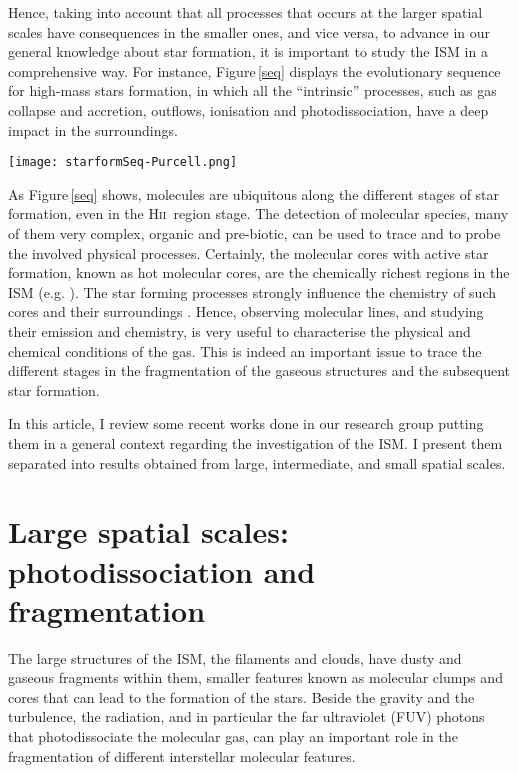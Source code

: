 \documentclass[baaa]{baaa}
\newcommand{\hii}{H\textsc{ii}}
\begin{document}
Hence, taking into account that all processes that occurs at the larger spatial scales have consequences in the smaller ones, and vice versa, to advance in our general knowledge about star formation, it is important to study the ISM in a comprehensive way.
For instance, Figure\,\ref{seq} displays the evolutionary sequence for high-mass stars formation, in which all the ``intrinsic'' processes, such as gas collapse and accretion, outflows, ionisation and photodissociation, have a deep impact in the surroundings. 

\begin{figure*}[h]
\centering
\texttt{[image: starformSeq-Purcell.png]}
\caption{Sketch showing the evolutionary sequence for high-mass stars formation.
Credits: Cormac Purcell.}
\label{seq}
\end{figure*}

As Figure\,\ref{seq} shows, molecules are ubiquitous along the different stages of star formation, even in the \hii~region stage. The detection of molecular species, many of them very complex, organic and pre-biotic, can be used to trace and to probe the involved physical processes. Certainly, the molecular cores with active star formation, known as hot molecular cores, are the chemically richest regions in the ISM (e.g. \citealt{herbst09,bonfand19}). The star forming processes strongly influence the chemistry of such cores and their surroundings \citep{jorgen20}. Hence, observing molecular lines, and studying their emission and chemistry, is very useful to characterise the physical and chemical conditions of the gas. This is indeed an important issue to trace the different stages in the fragmentation of the gaseous structures and the subsequent star formation. 

In this article, I review some recent works done in our research group putting them in a general context regarding the investigation of the ISM. I present them separated into results obtained from large, intermediate, and small spatial scales.


\section{Large spatial scales: photodissociation and fragmentation} 

The large structures of the ISM, the filaments and clouds, have dusty and gaseous fragments within them, smaller features known as molecular clumps and cores that can lead to the formation of the stars. Beside the gravity and the turbulence, the radiation, and in particular the far ultraviolet (FUV) photons that photodissociate the molecular gas, can play an important role in the fragmentation of different interstellar molecular features. 
\end{document}

